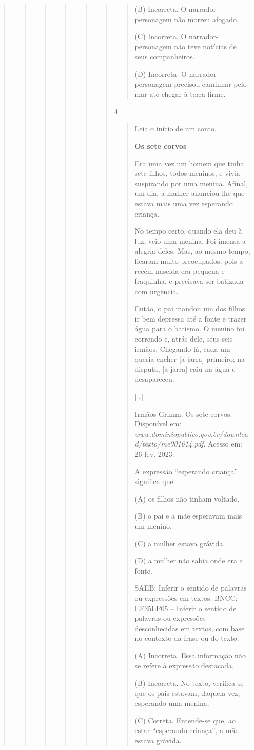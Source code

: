 \begin{boxlist}
{{\begin{quote}
\begin{quote}
\begin{quote}
{\begin{quote}
{\begin{quote}
\begin{quote}
\begin{quote}
(B) Incorreta. O narrador-personagem não morreu afogado.

(C) Incorreta. O narrador-personagem não teve notícias de seus companheiros.

(D) Incorreta. O narrador-personagem precisou caminhar pelo mar até chegar à terra firme.
\end{quote}

\num{4}

\begin{quote}
Leia o início de um conto.

\textbf{Os sete corvos}

Era uma vez um homem que tinha sete filhos, todos meninos, e vivia
suspirando por uma menina. Afinal, um dia, a mulher anunciou-lhe que
estava mais uma vez esperando criança.

No tempo certo, quando ela deu à luz, veio uma menina. Foi imensa a
alegria deles. Mas, ao mesmo tempo, ficaram muito preocupados, pois a
recém-nascida era pequena e fraquinha, e precisava ser batizada com
urgência.

Então, o pai mandou um dos filhos ir bem depressa até a fonte e trazer
água para o batismo. O menino foi correndo e, atrás dele, seus seis
irmãos. Chegando lá, cada um queria encher [a jarra] primeiro; na
disputa, [a jarra] caiu na água e desapareceu.

{[}\ldots{}{]}

Irmãos Grimm. Os sete corvos. Disponível em: \emph{
www.dominiopublico.gov.br/download/texto/me001614.pdf}. Acesso em: 26
fev. 2023.

A expressão ``esperando criança'' significa que

(A) os filhos não tinham voltado.

(B) o pai e a mãe esperavam mais um menino.

(C) a mulher estava grávida.

(D) a mulher não sabia onde era a fonte.

SAEB: Inferir o sentido de palavras ou expressões em textos.
BNCC: EF35LP05 -- Inferir o sentido de palavras ou expressões
desconhecidas em textos, com base no contexto da frase ou do texto.

(A) Incorreta. Essa informação não se refere à expressão destacada.

(B) Incorreta. No texto, verifica-se que os pais estavam, daquela vez,
esperando uma menina.

(C) Correta. Entende-se que, ao estar ``esperando criança'', a mãe estava
grávida.


\end{quote}
\end{quote}
\end{quote}}
\end{quote}}
\end{quote}
\end{quote}
\end{quote}}}
\end{boxlist}

